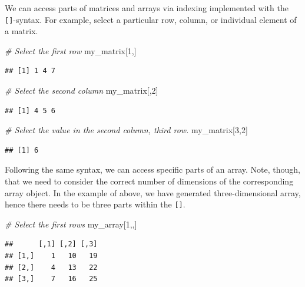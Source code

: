 \documentclass[
  12pt,
]{style/krantz}
\newenvironment{Shaded}{\begin{snugshade}}{\end{snugshade}}
\newcommand{\CommentTok}[1]{\textcolor[rgb]{0.56,0.35,0.01}{\textit{#1}}}
\newcommand{\DecValTok}[1]{\textcolor[rgb]{0.00,0.00,0.81}{#1}}
\newcommand{\NormalTok}[1]{#1}
\begin{document}
We can access parts of matrices and arrays via indexing implemented with the \texttt{{[}{]}}-syntax. For example, select a particular row, column, or individual element of a matrix.

\begin{Shaded}
\begin{Highlighting}[]
\CommentTok{\# Select the first row}
\NormalTok{my\_matrix[}\DecValTok{1}\NormalTok{,]}
\end{Highlighting}
\end{Shaded}

\begin{verbatim}
## [1] 1 4 7
\end{verbatim}

\begin{Shaded}
\begin{Highlighting}[]
\CommentTok{\# Select the second column}
\NormalTok{my\_matrix[,}\DecValTok{2}\NormalTok{]}
\end{Highlighting}
\end{Shaded}

\begin{verbatim}
## [1] 4 5 6
\end{verbatim}

\begin{Shaded}
\begin{Highlighting}[]
\CommentTok{\# Select the value in the second column, third row.}
\NormalTok{my\_matrix[}\DecValTok{3}\NormalTok{,}\DecValTok{2}\NormalTok{]}
\end{Highlighting}
\end{Shaded}

\begin{verbatim}
## [1] 6
\end{verbatim}

Following the same syntax, we can access specific parts of an array. Note, though, that we need to consider the correct number of dimensions of the corresponding array object. In the example of above, we have generated three-dimensional array, hence there needs to be three parts within the \texttt{{[}{]}}.

\begin{Shaded}
\begin{Highlighting}[]
\CommentTok{\# Select the first rows}
\NormalTok{my\_array[}\DecValTok{1}\NormalTok{,,]}
\end{Highlighting}
\end{Shaded}

\begin{verbatim}
##      [,1] [,2] [,3]
## [1,]    1   10   19
## [2,]    4   13   22
## [3,]    7   16   25
\end{verbatim}
\end{document}
